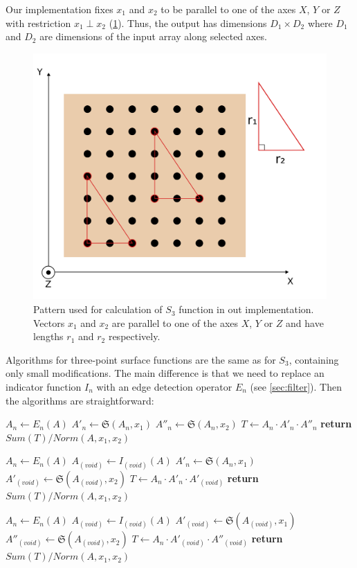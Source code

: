 \documentclass[1p]{elsarticle}
\begin{document}
Our implementation fixes $x_1$ and $x_2$ to be parallel to one of the axes $X$,
$Y$ or $Z$ with restriction $x_1 \perp x_2$ (\cref{fig:pattern}). Thus, the
output has dimensions $D_1 \times D_2$ where $D_1$ and $D_2$ are dimensions of
the input array along selected axes.
\begin{figure}[ht]
  \centering
  \includegraphics[width=0.5\linewidth]{images/pattern.png}
  \caption[]{Pattern used for calculation of $S_3$ function in out
    implementation. Vectors $x_1$ and $x_2$ are parallel to one of the axes $X$,
    $Y$ or $Z$ and have lengths $r_1$ and $r_2$ respectively.}
  \label{fig:pattern}
\end{figure}

Algorithms for three-point surface functions are the same as for $S_3$,
containing only small modifications. The main difference is that we need to
replace an indicator function $I_n$ with an edge detection operator $E_n$
(see \ref{sec:filter}). Then the algorithms are straightforward:
\begin{algorithmic}[1]
  \State $A_n \gets E_n (A)$
  \State $A'_n \gets \mathfrak{S}(A_n, x_1)$
  \State $A''_n \gets \mathfrak{S}(A_n, x_2)$
  \State $T \gets A_n \cdot A'_n \cdot A''_n$
  \State \textbf{return} $Sum(T) / Norm(A, x_1, x_2)$
  \EndProcedure

  \State $A_n \gets E_n (A)$
  \State $A_{(void)} \gets I_{(void)} (A)$
  \State $A'_n \gets \mathfrak{S}(A_n, x_1)$
  \State $A'_{(void)} \gets \mathfrak{S}(A_{(void)}, x_2)$
  \State $T \gets A_n \cdot A'_n \cdot A'_{(void)}$
  \State \textbf{return} $Sum(T) / Norm(A, x_1, x_2)$
  \EndProcedure

  \State $A_n \gets E_n (A)$
  \State $A_{(void)} \gets I_{(void)} (A)$
  \State $A'_{(void)} \gets \mathfrak{S}(A_{(void)}, x_1)$
  \State $A''_{(void)} \gets \mathfrak{S}(A_{(void)}, x_2)$
  \State $T \gets A_n \cdot A'_{(void)} \cdot A''_{(void)}$
  \State \textbf{return} $Sum(T) / Norm(A, x_1, x_2)$
  \EndProcedure
\end{algorithmic}
\end{document}
